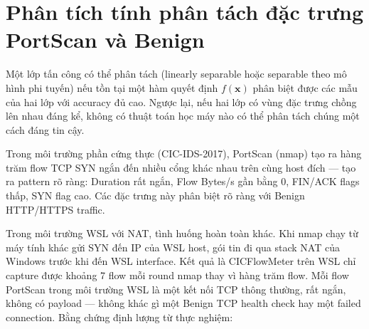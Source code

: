 \documentclass[../DoAn.tex]{subfiles}
\begin{document}
\section{Phân tích tính phân tách đặc trưng PortScan và Benign}
\label{sec:pt-portscan}

Một lớp tấn công có thể phân tách (linearly separable hoặc separable theo mô hình phi tuyến) nếu tồn tại một hàm quyết định $f(\mathbf{x})$ phân biệt được các mẫu của hai lớp với accuracy đủ cao. Ngược lại, nếu hai lớp có vùng đặc trưng chồng lên nhau đáng kể, không có thuật toán học máy nào có thể phân tách chúng một cách đáng tin cậy.

Trong môi trường phần cứng thực (CIC-IDS-2017), PortScan (nmap) tạo ra hàng trăm flow TCP SYN ngắn đến nhiều cổng khác nhau trên cùng host đích --- tạo ra pattern rõ ràng: Duration rất ngắn, Flow Bytes/s gần bằng 0, FIN/ACK flags thấp, SYN flag cao. Các đặc trưng này phân biệt rõ ràng với Benign HTTP/HTTPS traffic.

Trong môi trường WSL với NAT, tình huống hoàn toàn khác. Khi nmap chạy từ máy tính khác gửi SYN đến IP của WSL host, gói tin đi qua stack NAT của Windows trước khi đến WSL interface. Kết quả là CICFlowMeter trên WSL chỉ capture được khoảng 7 flow mỗi round nmap thay vì hàng trăm flow. Mỗi flow PortScan trong môi trường WSL là một kết nối TCP thông thường, rất ngắn, không có payload --- không khác gì một Benign TCP health check hay một failed connection. Bằng chứng định lượng từ thực nghiệm:

\begin{table}[H]
    \centering
    \caption{F1-score PortScan qua các thử nghiệm thuật toán và siêu tham số khác nhau (V8.2)}
    \label{tab:portscan-noseparability}
\end{table}
\end{document}
